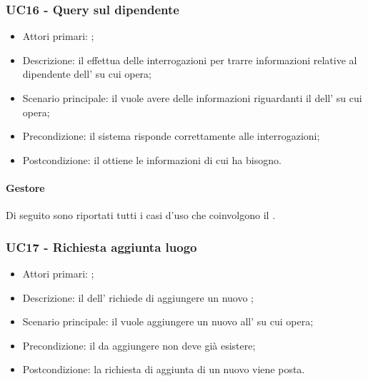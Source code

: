 \documentclass[../analisi-dei-requisiti]{subfiles}
\begin{document}
\subsubsection{UC16 - Query sul dipendente}
\label{subsub:UC16}

\begin{itemize}
\item Attori primari: ;
\item Descrizione: il  effettua delle interrogazioni per trarre informazioni relative al dipendente dell' su cui opera;
\item Scenario principale: il  vuole avere delle informazioni riguardanti il dell' su cui opera;
\item Precondizione: il sistema risponde correttamente alle interrogazioni;
\item Postcondizione: il  ottiene le informazioni di cui ha bisogno.

\end{itemize}

\paragraph{Gestore}
Di seguito sono riportati tutti i casi d'uso che coinvolgono il  .

\subsubsection{UC17 - Richiesta aggiunta luogo}
\label{subsub:UC17}

\begin{itemize}
\item Attori primari: ;
\item Descrizione: il  dell' richiede di aggiungere un nuovo ;
\item Scenario principale: il  vuole aggiungere un nuovo  all' su cui opera;
\item Precondizione: il  da aggiungere non deve già esistere;
\item Postcondizione: la richiesta di aggiunta di un nuovo  viene posta.

\end{itemize}
\end{document}

